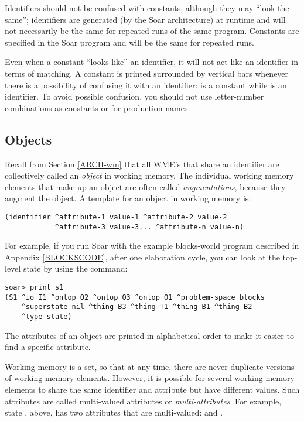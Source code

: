 Identifiers should not be confused with constants, although they may ``look
the same''; identifiers are generated (by the Soar architecture) at runtime
and will not necessarily be the same for repeated runs of the same program.
Constants are specified in the Soar program and will be the same for repeated
runs.

Even when a constant ``looks like'' an identifier, it will not act like
an identifier in terms of matching. A constant is printed surrounded by
vertical bars whenever there is a possibility of confusing it with an
identifier:  is a constant while  is an
identifier. To avoid possible confusion, you should not use
letter-number combinations as constants or for production names.

\subsection{Objects}

Recall from Section \ref{ARCH-wm} that all WME's that share an
identifier are collectively called an \textit{object} in working memory.
The individual working memory elements that make up an object are often
called \emph{augmentations}, because they augment the object.  A
template for an object in working memory is:
\begin{verbatim}
(identifier ^attribute-1 value-1 ^attribute-2 value-2 
            ^attribute-3 value-3... ^attribute-n value-n)
\end{verbatim}

For example, if you run Soar with the example blocks-world program described
in Appendix \ref{BLOCKSCODE}, after one elaboration cycle, you can look at the
top-level state by using the  command:
\label{example:prints1}
\begin{verbatim}
soar> print s1
(S1 ^io I1 ^ontop O2 ^ontop O3 ^ontop O1 ^problem-space blocks 
    ^superstate nil ^thing B3 ^thing T1 ^thing B1 ^thing B2 
    ^type state)
\end{verbatim} \vspace{12pt}
The attributes of an object are printed in alphabetical order to make it easier 
to find a specific attribute.

Working memory is a set, so that at any time, there are never duplicate
versions of working memory elements.  However, it is possible for
several working memory elements to share the same identifier and
attribute but have different values.  Such attributes are called
multi-valued attributes or \emph{multi-attributes}.  For example, state
, above, has two attributes that are multi-valued:  and 
. 


